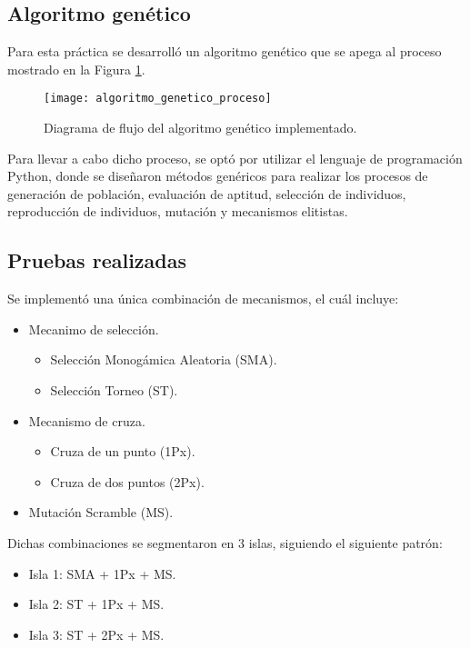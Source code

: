 \subsection{Algoritmo genético}
Para esta práctica se desarrolló un algoritmo genético que se apega al proceso mostrado en la Figura \ref{fig:AG}.

\begin{figure}[htbp]
	\centering
	\texttt{[image: algoritmo\_genetico\_proceso]}
	\caption{Diagrama de flujo del algoritmo genético implementado.}
	\label{fig:AG}
\end{figure}

Para llevar a cabo dicho proceso, se optó por utilizar el lenguaje de programación Python, donde se diseñaron métodos genéricos para realizar los procesos de generación de población, evaluación de aptitud, selección de individuos, reproducción de individuos, mutación y mecanismos elitistas.


\subsection{Pruebas realizadas}
Se implementó una única combinación de mecanismos, el cuál incluye:

\begin{itemize}
	\item Mecanimo de selección.
	\begin{itemize}
		\item Selección Monogámica Aleatoria (SMA).
		\item Selección Torneo (ST).
	\end{itemize}
	\item Mecanismo de cruza.
	\begin{itemize}
		\item Cruza de un punto (1Px).
		\item Cruza de dos puntos (2Px).
	\end{itemize}
	\item Mutación Scramble (MS).
\end{itemize}

Dichas combinaciones se segmentaron en 3 islas, siguiendo el siguiente patrón:

\begin{itemize}
	\item Isla 1: SMA + 1Px + MS.
	\item Isla 2: ST + 1Px + MS.
	\item Isla 3: ST + 2Px + MS.
\end{itemize}

